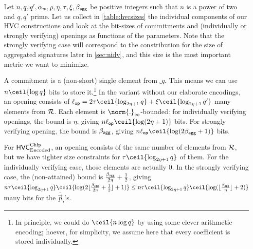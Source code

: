 \begin{remark}
Let $n, q, q',\alpha_w,\rho, \eta, \tau, \xi, \beta_{\mathsf{agg}}$ be positive integers such that $n$ is a power of two and $q,q'$ prime.
Let us collect in \autoref{table:hvcsizes} the individual components of our HVC constructions and look at the bit-sizes of commitments and (individually or strongly verifying) openings as functions of the parameters.
Note that the strongly verifying case will correspond to the constribution for the size of aggregated signatures later in \autoref{sec:nidv}, and this size is the most important metric we want to minimize.

A commitment is a (non-short) single element from $\ring_q$. This means we can use $n\ceil{\log q}$ bits to store it.\footnote{In principle, we could do $\ceil{n\log q}$ by using some clever arithmetic encoding; hoever, for simplicity, we assume here that every coefficient is stored individually.}
In the variant without our elaborate encodings, an opening consists of $\oplen = 2\tau\ceil{\log_{2\eta+1}q} + \xi\ceil{\log_{2\eta+1}q'}$ many elements from $\mathcal{R}$.
Each element is $\norm{.}_\infty$-bounded: for individually verifying openings, the bound is $\eta$, giving $n\oplen\ceil{\log (2\eta+1)}$ bits. For strongly verifying opening, the bound is $\beta_{\mathsf{agg}}$, giving $n\oplen\ceil{\log (2\bagg+1)}$ bits.

For $\mathsf{HVC}_{\textup{Encoded}}^{\textup{Chip}}$, an opening consists of the same number of elements from $\mathcal{R}$, but we have tighter size constraints for $\tau\ceil{\log_{2\eta+1}q}$ of them. For the individually verifying case, those elements are actually 0. In the strongly verifying case, the (non-attained) bound is $\tfrac{\beta_{\mathsf{agg}}}{2\eta}+\frac12$, giving $n\tau\ceil{\log_{2\eta+1}q}\ceil{\log(2\lfloor\frac{\bagg}{2\eta}+\frac12\rfloor +1 )} \leq n\tau\ceil{\log_{2\eta+1}q}\ceil{\log (\lfloor\tfrac{\bagg}{\eta}\rfloor+2)}$ many bits for the $\overline{\vec{p}}_i$'s.


\end{remark}
